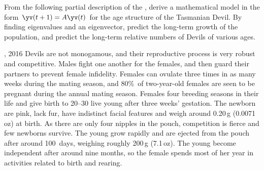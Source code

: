 \begin{exercise}  
From the following partial description of the , 
derive a mathematical model in the form \(\yv(t+1)=A\yv(t)\) for the age structure of the Tasmanian Devil.
By finding eigenvalues and an eigenvector, predict the long-term growth of the population, and predict the long-term relative numbers of Devils of various ages.
\begin{quoted}{, 2016}
Devils are not monogamous, and their reproductive process is very robust and competitive. 
Males fight one another for the females, and then guard their partners to prevent female infidelity. 
Females can ovulate three times in as many weeks during the mating season, and 80\%~of two-year-old females are seen to be pregnant during the annual mating season. 
Females  four breeding seasons in their life and give birth to 20--30 live young after three weeks' gestation. 
The newborn are pink, lack fur, have indistinct facial features and weigh around 0.20\,g (0.0071\,oz) at birth. 
As there are only four nipples in the pouch, competition is fierce and few newborns survive. 
The young grow rapidly and are ejected from the pouch after around 100~days, weighing roughly 200\,g (7.1\,oz). 
The young become independent after around nine months, so the female spends most of her year in activities related to birth and rearing.
\end{quoted}
\end{exercise}






